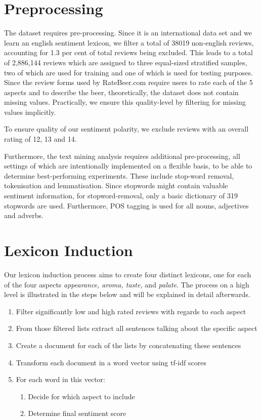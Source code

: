 \documentclass[11pt,titlepage,oneside,openany]{book}
\begin{document}
\section{Preprocessing}

The dataset requires pre-processing. Since it is an international data set and we learn an english sentiment lexicon, we filter a total of 38019 non-english reviews, accounting for 1.3 per cent of total reviews being excluded. This leads to a total of 2,886,144 reviews which are assigned to three equal-sized stratified samples, two of which are used for training and one of which is used for testing purposes. Since the review forms used by RateBeer.com require users to rate each of the 5 aspects and to describe the beer, theoretically, the dataset does not contain missing values. Practically, we ensure this quality-level by filtering for missing values implicitly.

To ensure quality of our sentiment polarity, we exclude reviews with an overall rating of 12, 13 and 14. 

Furthermore, the text mining analysis requires additional pre-processing, all settings of which are intentionally implemented on a flexible basis, to be able to determine best-performing experiments. These include stop-word removal, tokenisation and lemmatisation. Since stopwords might contain valuable sentiment information, for stopword-removal, only a basic dictionary of 319 stopwords are used. Furthermore, POS tagging is used for all nouns, adjectives and adverbs.



\section{Lexicon Induction}


Our lexicon induction process aims to create four distinct lexicons, one for each of the four aspects \emph{appearance, aroma, taste,} and \emph{palate}.
The process on a high level is illustrated in the steps below and will be explained in detail afterwards.

\begin{enumerate}[noitemsep]
  \item Filter significantly low and high rated reviews with regards to each aspect
  \item From those filtered lists extract all sentences talking about the specific aspect
  \item Create a document for each of the lists by concatenating these sentences
  \item Transform each document in a word vector using tf-idf scores
  \item For each word in this vector:
    \begin{enumerate}[noitemsep]
    \item Decide for which aspect to include
    \item Determine final sentiment score
  \end{enumerate}
\end{enumerate}
\end{document}
